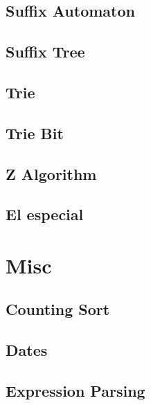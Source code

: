 \subsection{Suffix Automaton}
\raggedbottom
\hrulefill
\subsection{Suffix Tree}
\raggedbottom
\hrulefill
\subsection{Trie}
\raggedbottom
\hrulefill
\subsection{Trie Bit}
\raggedbottom
\hrulefill
\subsection{Z Algorithm}
\raggedbottom
\hrulefill
\subsection{El especial}
\raggedbottom
\hrulefill

\section{Misc}
\subsection{Counting Sort}
\raggedbottom
\hrulefill
\subsection{Dates}
\raggedbottom
\hrulefill
\subsection{Expression Parsing}
\raggedbottom
\hrulefill
